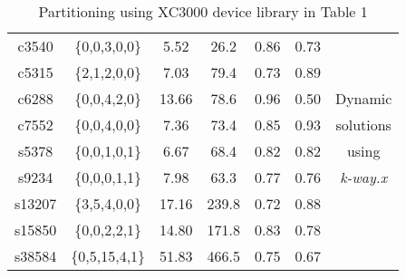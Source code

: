 \begin{table}[hpbt]
\begin{center}
\begin{tabular}{|c|c|c|c|c|c|c|}
 c3540        &\{0,0,3,0,0\}  &5.52         & 26.2     &0.86          &0.73        &\hfill \\ \cline{1-6}
 c5315        &\{2,1,2,0,0\}  &7.03         & 79.4     &0.73          &0.89        &\hfill \\ \cline{1-6}
 c6288        &\{0,0,4,2,0\}  &13.66        & 78.6     &0.96          &0.50        &Dynamic \\ \cline{1-6}
 c7552        &\{0,0,4,0,0\}  &7.36         & 73.4     &0.85          &0.93        &solutions \\ \cline{1-6}
 s5378        &\{0,0,1,0,1\}  &6.67         & 68.4     &0.82          &0.82        &using    \\
\cline{1-6}
 s9234        &\{0,0,0,1,1\}  &7.98         & 63.3     &0.77          &0.76        &{\sl k-way.x}  \\ \cline{1-6}
 s13207       &\{3,5,4,0,0\}  &17.16        & 239.8    &0.72          &0.88        &\hfill \\ \cline{1-6}
 s15850       &\{0,0,2,2,1\}  &14.80        & 171.8    &0.83          &0.78        &\hfill \\ \cline{1-6}
 s38584       &\{0,5,15,4,1\} &51.83        & 466.5    &0.75          &0.67        &\hfill \\ \hline
\end{tabular}
\caption{
Partitioning using XC3000 device library in Table 1
}
\label{tb:tb7}
\end{center}
\end{table}
